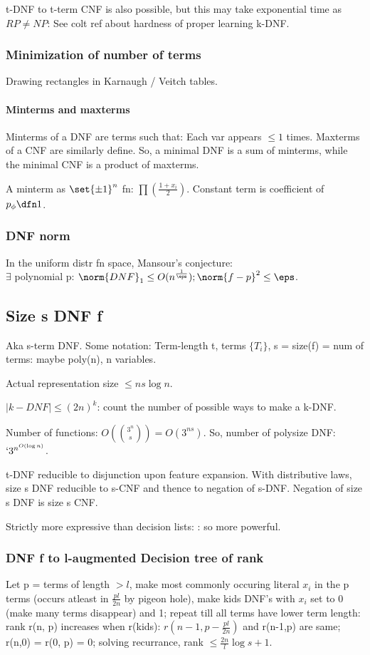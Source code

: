 \documentclass[oneside, article]{memoir}
\begin{document}
t-DNF to t-term CNF is also possible, but this may take exponential time as $RP \neq NP$: See colt ref about hardness of proper learning k-DNF.

\subsubsection{Minimization of number of terms}
Drawing rectangles in Karnaugh / Veitch tables.

\paragraph*{Minterms and maxterms}
Minterms of a DNF are terms such that: Each var appears $\leq 1$ times. Maxterms of a CNF are similarly define. So, a minimal DNF is a sum of minterms, while the minimal CNF is a product of maxterms.

A minterm as $\set{\pm 1}^{n}$ fn: $\prod(\frac{1+x_{i}}{2})$. Constant term is coefficient of $p_{\phi} \dfn 1$.

\subsubsection{DNF norm}
In the uniform distr fn space, Mansour's conjecture: \\
$\exists$ polynomial p: $\norm{DNF}_{1} \leq O(n^{\frac{1}{\eps}}); \norm{f-p}^{2} \leq \eps$.

\subsection{Size s DNF f}
Aka s-term DNF. Some notation: Term-length t, terms $\{T_{i}\}$, s = size(f) = num of terms: maybe poly(n), n variables. 

Actual representation size $\leq ns\log n$.

$|k-DNF| \leq (2n)^{k}$: count the number of possible ways to make a k-DNF.

Number of functions: $O(\binom{3^{n}}{s}) = O(3^{ns})$. So, number of polysize DNF: $`3^{n^{O(\log n)}}$.

t-DNF reducible to disjunction upon feature expansion. With distributive laws, size s DNF reducible to s-CNF and thence to negation of s-DNF. Negation of size s DNF is size s CNF.

Strictly more expressive than decision lists: \why: so more powerful.

\subsubsection{DNF f to l-augmented Decision tree of rank }
Let p = terms of length $>l$, make most commonly occuring literal $x_{i}$ in the p terms (occurs atleast in $\frac{pl}{2n}$ by pigeon hole), make kids DNF's with $x_{i}$ set to 0 (make many terms disappear) and 1; repeat till all terms have lower term length: rank r(n, p) increases when r(kids): $r(n-1, p-\frac{pl}{2n})$ and r(n-1,p) are same; r(n,0) = r(0, p) = 0; solving recurrance, rank $\leq \frac{2n}{l}\log s + 1$.
\end{document}
